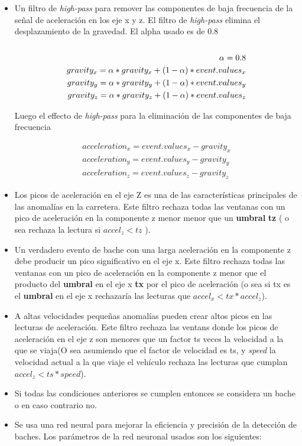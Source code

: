 		\begin{itemize}
			\item  Un filtro de \emph{high-pass} para remover las componentes de baja frecuencia de la señal de aceleración en los eje x y z.  El
				filtro de \emph{high-pass} elimina el desplazamiento de la gravedad. El alpha usado es de 0.8 \\\\
			\begin{align*}
				\alpha = 0.8 \\
				gravity_{x} = \alpha * gravity_x + (1-\alpha) *event.values_{x} \notag\\
				gravity_{y} = \alpha * gravity_y + (1-\alpha) *event.values_{y} \notag\\
				gravity_{z} = \alpha * gravity_z + (1-\alpha) *event.values_{z} \notag\\	
			\end{align*}
					
			Luego el effecto de \emph{high-pass} para la eliminación de las componentes de baja frecuencia
			
			\begin{align*}
				acceleration_{x} =  event.values_{x} - gravity_{x}\\
				acceleration_{y} = event.values_{y} - gravity_{y}\\
				acceleration_{z} = event.values_{z} - gravity_{z}
			\end{align*}

			\item Los picos de aceleración en el eje Z es una de las características principales de las anomalías en la carretera. Este filtro rechaza
				todas las ventanas con un pico de aceleración en la componente z menor menor que un \textbf{umbral} \textbf{tz} ( o sea rechaza la
				lectura si $accel_z < tz$ ). \item Un verdadero evento de bache con una larga aceleración en la componente z debe producir un pico
				significativo en el eje x. Este filtro rechaza todas las ventanas con un pico de aceleración en la componente z menor que  el producto
				del \textbf{umbral} en el eje x \textbf{tx} por  el pico de aceleración (o sea si tx es el \textbf{umbral} en el eje x rechazaría las
				lecturas que $accel_x < tx * accel_z$). \item A altas velocidades pequeñas anomalías pueden crear altos picos en las lecturas de
				aceleración. Este filtro rechaza las ventans donde los picos de aceleración en el eje z son menores que un factor ts veces la velocidad
				a la que se viaja(O sea asumiendo que el factor de velocidad es ts, y \emph{speed} la velocidad actual a la que viaje el vehículo rechaza
				las lecturas que cumplan $accel_z < ts * speed$). \item  Si todas las condiciones anteriores se cumplen entonces se considera un bache o
				en caso contrario no. \item  Se usa una red neural para mejorar la eficiencia y precisión de la detección de baches. Los parámetros de
				la red neuronal usados son los siguientes:\\


\end{itemize}

